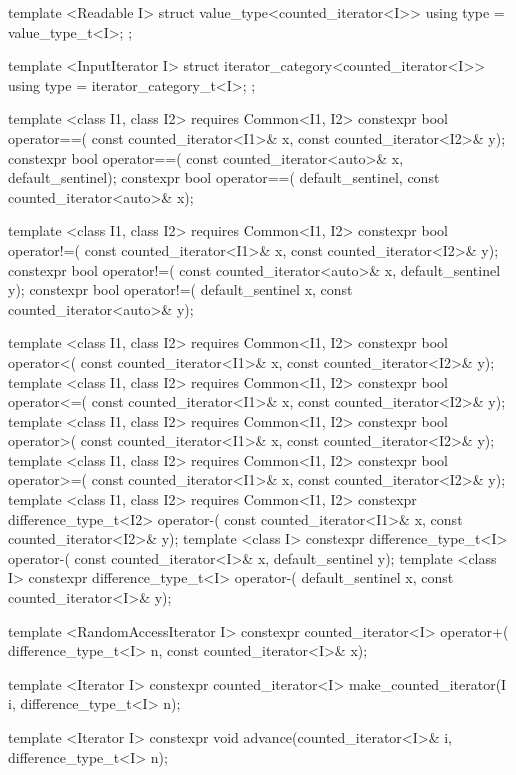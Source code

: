 \begin{codeblock}
{{{{  template <Readable I>
  struct value_type<counted_iterator<I>> {
    using type = value_type_t<I>;
  };

  template <InputIterator I>
  struct iterator_category<counted_iterator<I>> {
    using type = iterator_category_t<I>;
  };

  template <class I1, class I2>
      requires Common<I1, I2>
    constexpr bool operator==(
      const counted_iterator<I1>& x, const counted_iterator<I2>& y);
    constexpr bool operator==(
      const counted_iterator<auto>& x, default_sentinel);
    constexpr bool operator==(
      default_sentinel, const counted_iterator<auto>& x);

  template <class I1, class I2>
      requires Common<I1, I2>
    constexpr bool operator!=(
      const counted_iterator<I1>& x, const counted_iterator<I2>& y);
    constexpr bool operator!=(
      const counted_iterator<auto>& x, default_sentinel y);
    constexpr bool operator!=(
      default_sentinel x, const counted_iterator<auto>& y);

  template <class I1, class I2>
      requires Common<I1, I2>
    constexpr bool operator<(
      const counted_iterator<I1>& x, const counted_iterator<I2>& y);
  template <class I1, class I2>
      requires Common<I1, I2>
    constexpr bool operator<=(
      const counted_iterator<I1>& x, const counted_iterator<I2>& y);
  template <class I1, class I2>
      requires Common<I1, I2>
    constexpr bool operator>(
      const counted_iterator<I1>& x, const counted_iterator<I2>& y);
  template <class I1, class I2>
      requires Common<I1, I2>
    constexpr bool operator>=(
      const counted_iterator<I1>& x, const counted_iterator<I2>& y);
  template <class I1, class I2>
      requires Common<I1, I2>
    constexpr difference_type_t<I2> operator-(
      const counted_iterator<I1>& x, const counted_iterator<I2>& y);
  template <class I>
    constexpr difference_type_t<I> operator-(
      const counted_iterator<I>& x, default_sentinel y);
  template <class I>
    constexpr difference_type_t<I> operator-(
      default_sentinel x, const counted_iterator<I>& y);

  template <RandomAccessIterator I>
    constexpr counted_iterator<I> operator+(
      difference_type_t<I> n, const counted_iterator<I>& x);

  template <Iterator I>
    constexpr counted_iterator<I> make_counted_iterator(I i, difference_type_t<I> n);

  template <Iterator I>
    constexpr void advance(counted_iterator<I>& i, difference_type_t<I> n);
}}}}
\end{codeblock}

